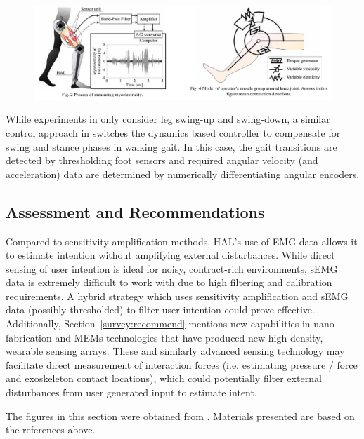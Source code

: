 \begin{refsection}
%
\begin{figure}[ht]
  \centering
  \includegraphics[width=6in]{exos/figs/hal_viscoelastic_control.png}
\end{figure}
%
%

While experiments in \cite{HALmuscleImped2005} only consider leg swing-up and swing-down, a similar control approach in \cite{HALvTorqueImp2002} switches the dynamics based controller to compensate for swing and stance phases in walking gait.  In this case, the gait transitions are detected by thresholding foot sensors and required angular velocity (and acceleration) data are determined by numerically differentiating angular encoders.


\subsection{Assessment and Recommendations}

Compared to sensitivity amplification methods, HAL's use of EMG data allows it to estimate intention without amplifying external disturbances.  While direct sensing of user intention is ideal for noisy, contract-rich environments, sEMG data is extremely difficult to work with due to high filtering and calibration requirements.  A hybrid strategy which uses sensitivity amplification and sEMG data (possibly thresholded) to filter user intention could prove effective.  Additionally, Section~\ref{survey:recommend} mentions new capabilities in nano-fabrication and MEMs technologies that have produced new high-density, wearable sensing arrays. These and similarly advanced sensing technology may facilitate direct measurement of interaction forces (i.e. estimating pressure / force and exoskeleton contact locations), which could potentially filter external disturbances from user generated input to estimate intent.

\nocite{*}
\printbibliography[heading=subbibliography]

The figures in this section were obtained from \cite{HALmuscleImped2005,HALassist2011}.  Materials presented are based on the references above.

\end{refsection}




